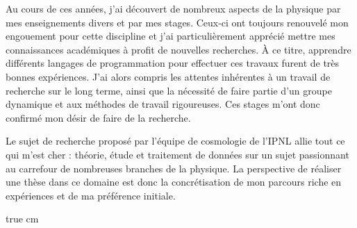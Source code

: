 \documentclass[11pt,a4]{article}
\begin{document}
Au cours de ces années, j'ai découvert de nombreux aspects de la physique par mes enseignements
divers et par mes stages. Ceux-ci ont toujours renouvelé mon engouement pour cette discipline et
j'ai particulièrement apprécié mettre mes connaissances académiques à profit de nouvelles
recherches. À ce titre, apprendre différents langages de programmation pour effectuer ces travaux
furent de très bonnes expériences. J'ai alors compris les attentes inhérentes à un travail de
recherche sur le long terme, ainsi que la nécessité de faire partie d'un groupe dynamique et aux
méthodes de travail rigoureuses. Ces stages m'ont donc confirmé mon désir de faire de la recherche. 

Le sujet de recherche proposé par l'équipe de cosmologie de l'IPNL allie tout ce qui m'est cher :
théorie, étude et traitement de données sur un sujet passionnant au carrefour de nombreuses branches
de la physique. La perspective de réaliser une thèse dans ce domaine est donc la concrétisation de
mon parcours riche en expériences et de ma préférence initiale.

 true cm













\end{document}
